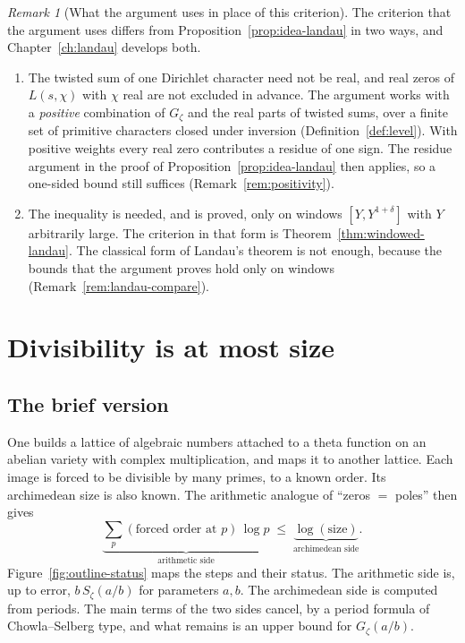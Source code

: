 \documentclass[11pt]{amsbook}
\theoremstyle{plain}
\theoremstyle{definition}
\theoremstyle{remark}
\newtheorem{remark}[theorem]{Remark}
\numberwithin{equation}{section}
\numberwithin{figure}{chapter}
\numberwithin{table}{chapter}
\newcommand{\Gz}{G_{\zeta}}
\newcommand{\Sz}{S_{\zeta}}
\begin{document}
\begin{remark}[What the argument uses in place of this criterion]
\label{rem:archive-landau}
The criterion that the argument uses differs from
Proposition~\ref{prop:idea-landau} in two ways, and
Chapter~\ref{ch:landau} develops both.
\begin{enumerate}[label=(\arabic*)]
\item The twisted sum of one Dirichlet character need not be
real, and real zeros of $L(s,\chi)$ with $\chi$ real are not
excluded in advance. The argument works with a \emph{positive}
combination of $\Gz$ and the real parts of twisted sums, over a
finite set of primitive characters closed under inversion
(Definition~\ref{def:level}). With positive weights every real zero
contributes a residue of one sign. The residue argument in the
proof of Proposition~\ref{prop:idea-landau} then applies, so a
one-sided bound still suffices (Remark~\ref{rem:positivity}).
\item The inequality is needed, and is proved, only on windows
$[Y, Y^{1+\delta}]$ with $Y$ arbitrarily large. The criterion in
that form is Theorem~\ref{thm:windowed-landau}. The classical form
of Landau's theorem is not enough, because the bounds that the
argument proves hold only on windows
(Remark~\ref{rem:landau-compare}).
\end{enumerate}
\end{remark}

\section{Divisibility is at most size}\label{sec:slope}

\subsection{The brief version}

One builds a lattice of algebraic numbers attached to a theta
function on an abelian variety with complex multiplication, and maps
it to another lattice. Each image is forced to be divisible by many
primes, to a known order. Its archimedean size is also known. The
arithmetic analogue of ``zeros $=$ poles'' then gives
\[
  \underbrace{\textstyle\sum_p (\text{forced order at } p)\,\log p}
  _{\text{arithmetic side}}
  \;\le\;
  \underbrace{\log(\text{size})}_{\text{archimedean side}} .
\]
Figure~\ref{fig:outline-status} maps the steps and their status. The arithmetic side is, up to error, $b\,\Sz(a/b)$ for parameters
$a, b$. The archimedean side is computed from periods. The main
terms of the two sides cancel, by a period formula of
Chowla--Selberg type, and what remains is an upper bound for
$\Gz(a/b)$.
\begin{figure}[tbp]
\centering

\end{figure}
\end{document}
